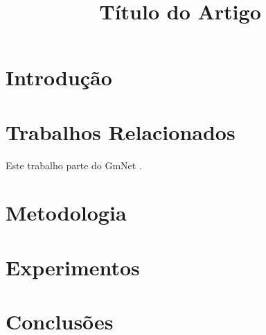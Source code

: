 \documentclass[conference]{IEEEtran}
\begin{document}
\title{Título do Artigo}

\author{
}

\maketitle

\begin{abstract}
\end{abstract}

\begin{IEEEkeywords}
\end{IEEEkeywords}

\section{Introdução}

\section{Trabalhos Relacionados}
Este trabalho parte do GmNet \cite{wang2026gmnet}.

\section{Metodologia}

\section{Experimentos}

\section{Conclusões}


\end{document}
